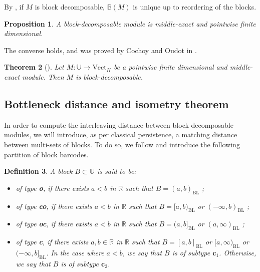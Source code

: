 \documentclass[11pt]{article}
\newtheorem{theorem}{Theorem}[section]
\newtheorem{proposition}[theorem]{Proposition}
\newtheorem{definition}[theorem]{Definition}
\theoremstyle{remark}
\newcommand{\R}{\mathbb{R}}
\begin{document}
By \cite[Theorem 1.1]{BotCraw18}, if $M$ is block decomposable, $\mathbb{B}(M)$ is unique up to reordering of the blocks.

\begin{proposition}
A block-decomposable module is middle-exact and pointwise finite dimensional.
\end{proposition}

The converse holds, and was proved by Cochoy and Oudot in \cite{Cochoy16}.

\begin{theorem}[\cite{Cochoy16}] 
Let $M : \mathbb{U} \longrightarrow \text{Vect}_K$ be a pointwise finite dimensional and middle-exact module. Then $M$ is block-decomposable.
\end{theorem}

\subsection{Bottleneck distance and isometry theorem}


In order to compute the interleaving distance between block decomposable modules, we will introduce, as per classical persistence, a matching distance between multi-sets of blocks. To do so, we follow \cite{2018} and introduce the following partition of block barcodes. 

\begin{definition}
A block $B \subset \mathbb{U}$ is said to be:

\begin{itemize}
    \item of type \textbf{o}, if there exists $a<b$ in $\R$ such that $B=(a,b)_{\mathrm{BL}}$ ;
    
    \item of type \textbf{co}, if there exists $a<b$ in $\R$ such that $B=[a,b)_{\mathrm{BL}}$ or $(-\infty,b)_{\mathrm{BL}}$ ;
    
    \item of type \textbf{oc}, if there exists $a<b$ in $\R$ such that $B=(a,b]_{\mathrm{BL}}$ or $(a,\infty)_{\mathrm{BL}}$ ;
    
    \item of type \textbf{c}, if there exists $a,b\in \R$ in $\R$ such that $B=[a,b]_{\mathrm{BL}}$ or $[a,\infty)_{\mathrm{BL}}$ or $(-\infty,b]_{\mathrm{BL}}$. In the case where $a < b$, we say that $B$ is of subtype $\textbf{c}_1$. Otherwise, we say that $B$ is of subtype $\textbf{c}_2$.
\end{itemize}
\end{definition}
\end{document}
